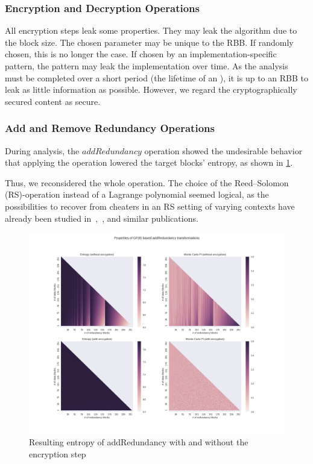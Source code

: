 \subsubsection{Encryption and Decryption Operations}
All encryption steps leak some properties. They may leak the algorithm due to the block size. The chosen parameter may be unique to the RBB. If randomly chosen, this is no longer the case. If chosen by an implementation-specific pattern, the pattern may leak the implementation over time. As the analysis must be completed over a short period (the lifetime of an ), it is up to an RBB to leak as little information as possible. However, we regard the cryptographically secured content as secure. 

\subsubsection{Add and Remove Redundancy Operations}\label{sec:analysisReedSolomon}
During analysis, the $addRedundancy$ operation showed the undesirable behavior that applying the operation lowered the target blocks' entropy, as shown in \cref{fig:entropy}. 

Thus, we reconsidered the whole operation. The choice of the Reed--Solomon (RS)-operation instead of a Lagrange polynomial seemed logical, as the possibilities to recover from cheaters in an RS setting of varying contexts have already been studied in~\cite{mceliece1981sharing},~\cite{bu2017rasss}, and similar publications.

\begin{figure}[!t]\centering
	\includegraphics[width=1\textwidth]{inc/randomblock_10kb}
	\caption{Resulting entropy of addRedundancy with and without the encryption step}
	\label{fig:entropy}
\end{figure}


